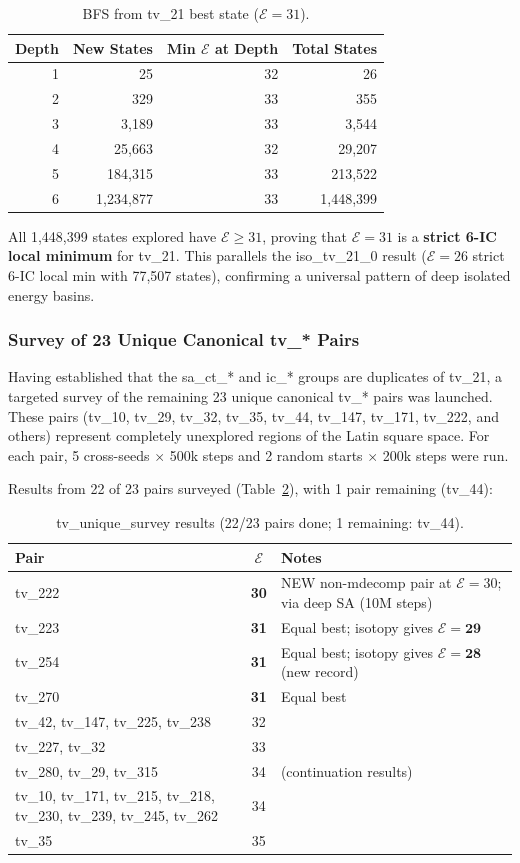 \documentclass[11pt,a4paper]{article}
\theoremstyle{remark}
\newcommand{\E}{\mathcal{E}}
\begin{document}
\begin{table}[h]
\centering
\caption{BFS from tv\_21 best state ($\E=31$).}\label{tab:bfs_tv21}
\begin{tabular}{rrrr}
\toprule
Depth & New States & Min $\E$ at Depth & Total States\\
\midrule
1 & 25 & 32 & 26\\
2 & 329 & 33 & 355\\
3 & 3{,}189 & 33 & 3{,}544\\
4 & 25{,}663 & 32 & 29{,}207\\
5 & 184{,}315 & 33 & 213{,}522\\
6 & 1{,}234{,}877 & 33 & 1{,}448{,}399\\
\bottomrule
\end{tabular}
\end{table}

All 1,448,399 states explored have $\E \geq 31$, proving that $\E=31$ is a
\textbf{strict 6-IC local minimum} for tv\_21. This parallels the iso\_tv\_21\_0
result ($\E=26$ strict 6-IC local min with 77,507 states), confirming a universal
pattern of deep isolated energy basins.

\subsubsection{Survey of 23 Unique Canonical tv\_* Pairs}

Having established that the sa\_ct\_* and ic\_* groups are duplicates of tv\_21,
a targeted survey of the remaining 23 unique canonical tv\_* pairs was launched.
These pairs (tv\_10, tv\_29, tv\_32, tv\_35, tv\_44, tv\_147, tv\_171, tv\_222, and others)
represent completely unexplored regions of the Latin square space. For each pair,
5 cross-seeds $\times$ 500k steps and 2 random starts $\times$ 200k steps were run.

Results from 22 of 23 pairs surveyed (Table~\ref{tab:tv_survey}), with 1 pair remaining (tv\_44):

\begin{table}[h]
\centering
\caption{tv\_unique\_survey results (22/23 pairs done; 1 remaining: tv\_44).}\label{tab:tv_survey}
\begin{tabular}{lcl}
\toprule
Pair & $\E$ & Notes\\
\midrule
tv\_222 & \textbf{30} & NEW non-mdecomp pair at $\E=30$; via deep SA (10M steps)\\
tv\_223 & \textbf{31} & Equal best; isotopy gives $\E=\mathbf{29}$\\
tv\_254 & \textbf{31} & Equal best; isotopy gives $\E=\mathbf{28}$ (new record)\\
tv\_270 & \textbf{31} & Equal best\\
tv\_42, tv\_147, tv\_225, tv\_238 & 32 & \\
tv\_227, tv\_32 & 33 & \\
tv\_280, tv\_29, tv\_315 & 34 & (continuation results)\\
tv\_10, tv\_171, tv\_215, tv\_218, tv\_230, tv\_239, tv\_245, tv\_262 & 34 & \\
tv\_35 & 35 & \\
\bottomrule
\end{tabular}
\end{table}
\end{document}
